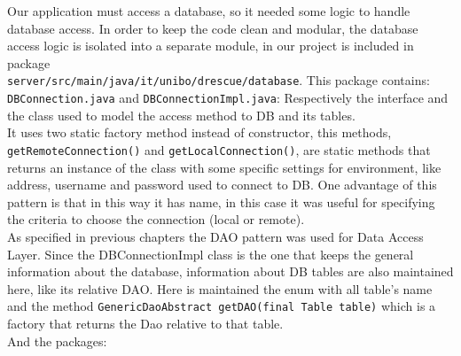 \documentclass[a4paper,12pt]{report}
\begin{document}
Our application must access a database, so it needed some logic to handle database access. In order to keep the code clean and modular, the database access logic is isolated into a separate module, in our project is included in package\\ \texttt{server/src/main/java/it/unibo/drescue/database}. This package contains:\\

\texttt{DBConnection.java} and \texttt{DBConnectionImpl.java}: Respectively the interface and the class used to model the access method to DB and its tables.\\
It uses two static factory method instead of constructor, this methods, \\ \texttt{getRemoteConnection()} and \texttt{getLocalConnection()}, are static methods that returns an instance of the class with some specific settings for environment, like address, username and password used to connect to DB. One advantage of this pattern is that in this way it has name, in this case it was useful for specifying the criteria to choose the connection (local or remote).\\
As specified in previous chapters the DAO pattern was used for Data Access Layer. Since the DBConnectionImpl class is the one that keeps the general information about the database, information about DB tables are also maintained here, like its relative DAO. Here is maintained the enum with all table's name and the method \texttt{GenericDaoAbstract getDAO(final Table table)} which is a factory that returns the Dao relative to that table.\\

And the packages:\\
\end{document}
